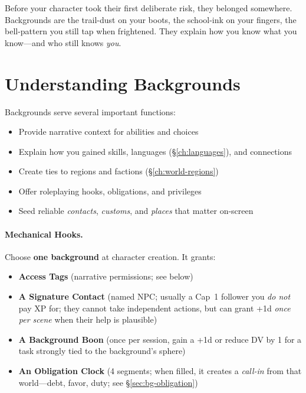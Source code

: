\begin{multicols}{2}

Before your character took their first deliberate risk, they belonged somewhere. Backgrounds are the trail-dust on your boots, the school-ink on your fingers, the bell-pattern you still tap when frightened. They explain how you know what you know—and who still knows \emph{you}.

\section{Understanding Backgrounds}

Backgrounds serve several important functions:
\begin{itemize}
\item Provide narrative context for abilities and choices
\item Explain how you gained skills, languages (\S\ref{ch:languages}), and connections
\item Create ties to regions and factions (\S\ref{ch:world-regions})
\item Offer roleplaying hooks, obligations, and privileges
\item Seed reliable \emph{contacts}, \emph{customs}, and \emph{places} that matter on-screen
\end{itemize}

\paragraph{Mechanical Hooks.}
Choose \textbf{one background} at character creation. It grants:
\begin{itemize}
\item \textbf{Access Tags} (narrative permissions; see below)
\item \textbf{A Signature Contact} (named NPC; usually a Cap~1 follower you \emph{do not} pay XP for; they cannot take independent actions, but can grant +1d \emph{once per scene} when their help is plausible)
\item \textbf{A Background Boon} (once per session, gain a +1d or reduce DV by 1 for a task strongly tied to the background’s sphere)
\item \textbf{An Obligation Clock} (4 segments; when filled, it creates a \emph{call-in} from that world—debt, favor, duty; see \S\ref{sec:bg-obligation})
\end{itemize}


\end{multicols}
